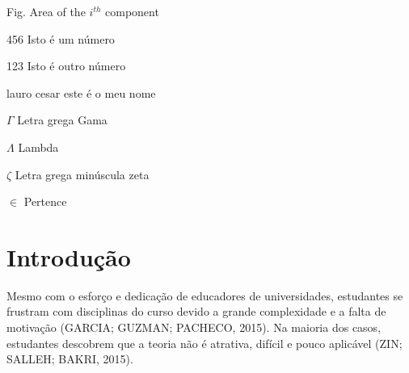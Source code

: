 \documentclass[
	12pt,				%
	oneside,			%
	a4paper,			%
	english,			%
	french,				%
	spanish,			%
	brazil,				%
	]{abntex2}
\begin{document}

\listoffigures*
\cleardoublepage

\listoftables*
\cleardoublepage

\begin{siglas}
  \item[Fig.] Area of the $i^{th}$ component
  \item[456] Isto é um número
  \item[123] Isto é outro número
  \item[lauro cesar] este é o meu nome
\end{siglas}

\begin{simbolos}
  \item[$ \Gamma $] Letra grega Gama
  \item[$ \Lambda $] Lambda
  \item[$ \zeta $] Letra grega minúscula zeta
  \item[$ \in $] Pertence
\end{simbolos}

\tableofcontents*
\cleardoublepage



\textual

\chapter{Introdução}

Mesmo com o esforço e dedicação de educadores de universidades, estudantes se frustram com disciplinas do curso devido a grande complexidade e a falta de motivação (GARCIA; GUZMAN; PACHECO, 2015). Na maioria dos casos, estudantes descobrem que a teoria não é atrativa, difícil e pouco aplicável (ZIN; SALLEH; BAKRI, 2015).



\end{document}
